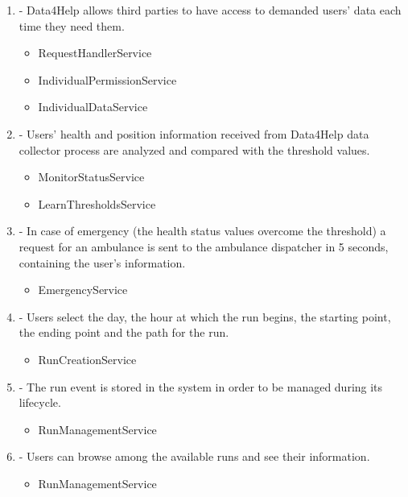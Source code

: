\documentclass[a4paper]{article}
\begin{document}
\begin{enumerate}[label*=\bf{R.\arabic*}]
\item - Data4Help allows third parties to have access to demanded users’ data each time they need them.

\begin{itemize}
\item RequestHandlerService
\item IndividualPermissionService
\item IndividualDataService
\end{itemize}

\item - Users’ health and position information received from Data4Help data collector process are analyzed and compared with the threshold values.

\begin{itemize}
\item MonitorStatusService
\item LearnThresholdsService
\end{itemize}

\item - In case of emergency (the health status values overcome the threshold) a request for an ambulance is sent to the ambulance dispatcher in 5 seconds, containing the user’s information.

\begin{itemize}
\item EmergencyService
\end{itemize}

\item - Users select the day, the hour at which the run begins, the starting point, the ending point and the path for the run.

\begin{itemize}
\item RunCreationService
\end{itemize}

\item - The run event is stored in the system in order to be managed during its lifecycle.

\begin{itemize}
\item RunManagementService
\end{itemize}

\item - Users can browse among the available runs and see their information.

\begin{itemize}
\item RunManagementService
\end{itemize}


\end{enumerate}
\end{document}
